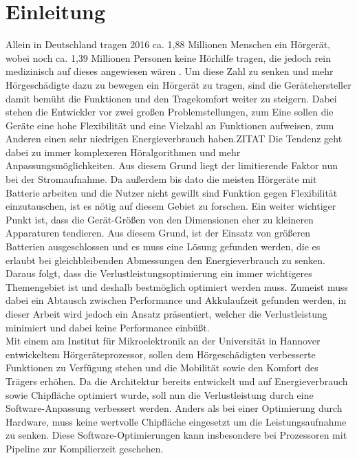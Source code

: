 
\thispagestyle{empty}
%
\chapter{Einleitung}
\label{chap:introduction}
Allein in Deutschland tragen 2016 ca. 1,88 Millionen Menschen ein Hörgerät, wobei noch ca. 1,39 Millionen Personen keine Hörhilfe tragen, die jedoch rein medizinisch auf dieses angewiesen wären \cite{statistica}. Um diese Zahl zu senken und mehr Hörgeschädigte dazu zu bewegen ein Hörgerät zu tragen, sind die Gerätehersteller damit bemüht die Funktionen und den Tragekomfort weiter zu steigern.
Dabei stehen die Entwickler vor zwei großen Problemstellungen, zum Eine sollen die Geräte eine hohe Flexibilität und eine Vielzahl an Funktionen aufweisen, zum Anderen einen sehr niedrigen Energieverbrauch haben.ZITAT Die Tendenz geht dabei zu immer komplexeren Höralgorithmen und mehr Anpassungsmöglichkeiten. Aus diesem Grund liegt der limitierende Faktor nun bei der Stromaufnahme.
Da außerdem bis dato die meisten Hörgeräte mit Batterie arbeiten und die Nutzer nicht gewillt sind Funktion gegen Flexibilität einzutauschen, ist es nötig auf diesem Gebiet zu forschen. Ein weiter wichtiger Punkt ist, dass die Gerät-Größen von den Dimensionen eher zu kleineren Apparaturen tendieren. Aus diesem Grund, ist der Einsatz von größeren Batterien ausgeschlossen und es muss eine Lösung gefunden werden, die es erlaubt bei gleichbleibenden Abmessungen den Energieverbrauch zu senken. Daraus folgt, dass die Verlustleistungsoptimierung ein immer wichtigeres Themengebiet ist und deshalb bestmöglich optimiert werden muss. 
Zumeist muss dabei ein Abtausch zwischen Performance und Akkulaufzeit gefunden werden, in dieser Arbeit wird jedoch ein Ansatz präsentiert, welcher die Verlustleistung minimiert und dabei keine Performance einbüßt.\\
Mit einem am Institut für Mikroelektronik an der Universität in Hannover entwickeltem Hörgeräteprozessor, sollen dem Hörgeschädigten verbesserte Funktionen zu Verfügung stehen und die Mobilität sowie den Komfort des Trägers erhöhen. Da die Architektur bereits entwickelt und auf Energieverbrauch sowie Chipfläche optimiert wurde, soll nun die Verlustleistung durch eine Software-Anpassung verbessert werden. Anders als bei einer Optimierung durch Hardware, muss keine wertvolle Chipfläche eingesetzt um die Leistungsaufnahme zu senken. Diese Software-Optimierungen kann insbesondere bei Prozessoren mit Pipeline zur Kompilierzeit geschehen.\\
